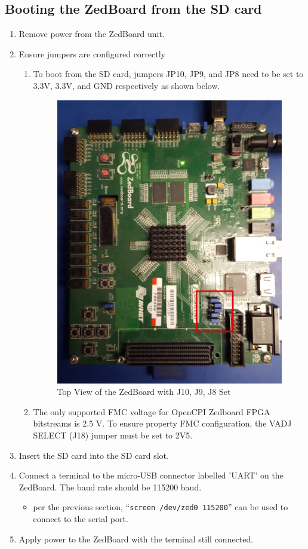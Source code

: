 \subsection{Booting the ZedBoard from the SD card}
\begin{enumerate}
\item Remove power from the ZedBoard unit.
\item Ensure jumpers are configured correctly
\begin{enumerate}
\item To boot from the SD card, jumpers JP10, JP9, and JP8 need to be set to 3.3V, 3.3V, and GND respectively as shown below.
\begin{figure}[ht]
	\centerline{\includegraphics[scale=0.15]{zed_top}}
	\caption{Top View of the ZedBoard with J10, J9, J8 Set}
	\label{fig:zed_top}
\end{figure}
\item The only supported FMC voltage for OpenCPI Zedboard FPGA bitstreams is 2.5 V. To ensure property FMC configuration, the VADJ SELECT (J18) jumper must be set to 2V5.
\end{enumerate}
\item Insert the SD card into the SD card slot.
\item Connect a terminal to the micro-USB connector labelled 'UART' on the ZedBoard. The baud rate should be 115200 baud.
\begin{itemize}
\item per the previous section, ``\texttt{screen /dev/zed0 115200}'' can be used to connect to the serial port.
\end{itemize}
\item Apply power to the ZedBoard with the terminal still connected.
\end{enumerate}

